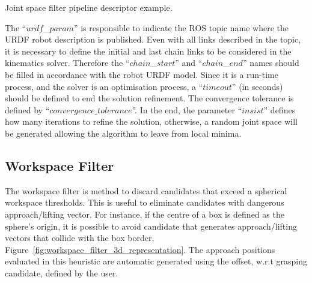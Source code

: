 \begin{snippet}[h!]
\centering
{}
\caption{Joint space filter pipeline descriptor example.}
\label{code:joint_space_filter}
\end{snippet}

The ``$urdf$\_$param$'' is responsible to indicate the ROS topic name where the URDF robot description is published. Even with all links described in the topic, it is necessary to define the initial and last chain links to be considered in the kinematics solver. Therefore the ``$chain$\_$start$'' and ``$chain$\_$end$'' names should be filled in accordance with the robot URDF model.  Since it is a run-time process, and the solver is an optimisation process, a ``$timeout$'' (in seconds) should be defined to end the solution refinement. The convergence tolerance is defined by ``$convergence\_tolerance$''.  In the end, the parameter ``$insist$'' defines how many iterations to refine the solution, otherwise, a random joint space will be generated allowing the algorithm to leave from local minima. 






\subsection{Workspace Filter}
\label{cap4:modular_grasping_architecture:sec:grasp_selection:subsec:workspace_filter}

The workspace filter is method to discard candidates that exceed a spherical workspace thresholds. This is useful to eliminate candidates with dangerous approach/lifting vector. For instance, if the centre of a box is defined as the sphere's origin, it is possible to avoid candidate that generates approach/lifting vectors that collide with the box border, Figure~\ref{fig:workspace_filter_3d_representation}. The approach positions evaluated in this heuristic are automatic generated using the offset, w.r.t grasping candidate, defined by the user.

